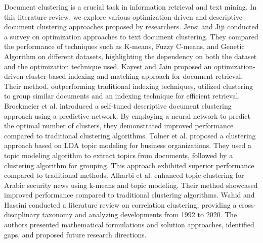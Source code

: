 \documentclass{article}
\begin{document}
Document clustering is a crucial task in information retrieval and text mining. In this literature review, we explore various optimization-driven and descriptive document clustering approaches proposed by researchers.
Jensi and Jiji \cite{jensi2014survey} conducted a survey on optimization approaches to text document clustering. They compared the performance of techniques such as K-means, Fuzzy C-means, and Genetic Algorithm on different datasets, highlighting the dependency on both the dataset and the optimization technique used. Kayest and Jain \cite{kayest2022optimization} proposed an optimization-driven cluster-based indexing and matching approach for document retrieval. Their method, outperforming traditional indexing techniques, utilized clustering to group similar documents and an indexing technique for efficient retrieval. Brockmeier et al. \cite{brockmeier2018self} introduced a self-tuned descriptive document clustering approach using a predictive network. By employing a neural network to predict the optimal number of clusters, they demonstrated improved performance compared to traditional clustering algorithms. Tolner et al. \cite{9668337} proposed a clustering approach based on LDA topic modeling for business organizations. They used a topic modeling algorithm to extract topics from documents, followed by a clustering algorithm for grouping. This approach exhibited superior performance compared to traditional methods. Alharbi et al. \cite{alharbi2021enhancing} enhanced topic clustering for Arabic security news using k-means and topic modeling. Their method showcased improved performance compared to traditional clustering algorithms. Wahid and Hassini \cite{wahid2022literature} conducted a literature review on correlation clustering, providing a cross-disciplinary taxonomy and analyzing developments from 1992 to 2020. The authors presented mathematical formulations and solution approaches, identified gaps, and proposed future research directions.
\end{document}
